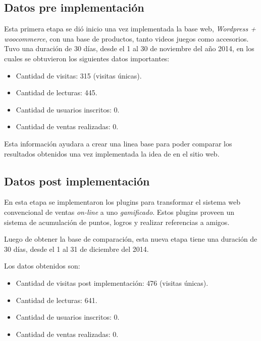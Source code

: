 \subsection{Datos pre implementación {\GAM}}

Esta primera etapa se dió inicio una vez implementada la base web,
\emph{Wordpress + woocommerce}, con una base de productos, tanto videos juegos como
accesorios.
Tuvo una duración de 30 días, desde el 1 al 30 de noviembre del año 2014,
en los cuales se obtuvieron los siguientes datos importantes:


\begin{itemize}
    \item Cantidad de visitas: 315 (visitas únicas).
    \item Cantidad de lecturas: 445.
    \item Cantidad de usuarios inscritos: 0.
    \item Cantidad de ventas realizadas: 0.
\end{itemize}

Esta información ayudara a crear una linea base para poder comparar los
resultados obtenidos una vez implementada la idea de {\GAM} en el sitio web.


\subsection{Datos post implementación {\GAM}}

En esta etapa se implementaron los plugins para transformar el sistema web
convencional de ventas \emph{on-line} a uno \emph{gamificado}.
Estos plugins proveen un sistema de acumulación de puntos,
logros y realizar referencias a amigos.

Luego de obtener la base de comparación, esta nueva etapa tiene una duración
de 30 días, desde el 1 al 31 de diciembre del 2014.

Los datos obtenidos son:

\begin{itemize}
    \item Cantidad de visitas post implementación: 476 (visitas únicas).
    \item Cantidad de lecturas: 641.
    \item Cantidad de usuarios inscritos: 0.
    \item Cantidad de ventas realizadas: 0.
\end{itemize}

